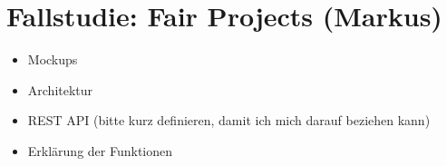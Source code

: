 \section{Fallstudie: Fair Projects (Markus)}
\label{fallstudie-fair-projects}

\begin{itemize}
	\item Mockups
	\item Architektur
	\item REST API (bitte kurz definieren, damit ich mich darauf beziehen kann)
	\item Erklärung der Funktionen
\end{itemize}